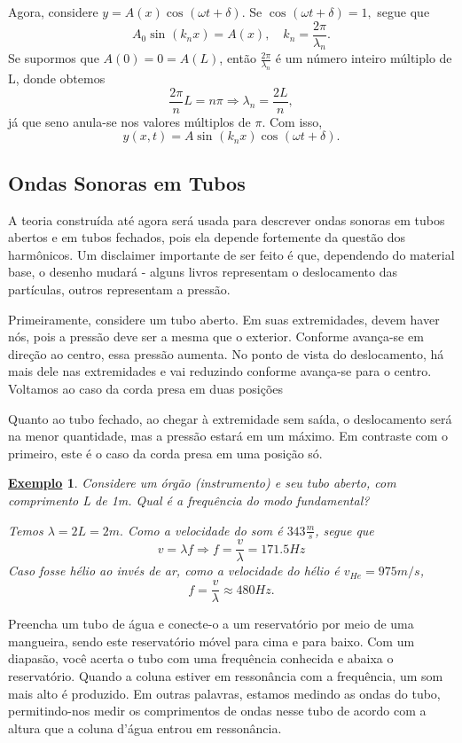 \documentclass{article}
\newtheorem{example}{\underline{Exemplo}}
\begin{document}
Agora, considere \(y = A(x)\cos^{}{(\omega t + \delta )}\). Se \(\cos^{}{(\omega t + \delta )}=1,\) segue que 
\[
  A_{0}\sin^{}{(k_{n}x)} = A(x),\quad k_{n} = \frac{2\pi }{\lambda_{n}}.
\]
Se supormos que \(A(0) = 0 = A(L)\), então \(\frac{2\pi }{\lambda_{n}}\) é um número inteiro múltiplo de L, donde obtemos 
\[
  \frac{2\pi }{n}L = n\pi \Rightarrow \lambda_{n} = \frac{2L}{n},
\]
já que seno anula-se nos valores múltiplos de \(\pi \). Com isso, 
\[
  y(x, t) = A\sin^{}{(k_{n}x)}\cos^{}{(\omega t + \delta )}.
\]
\subsection{Ondas Sonoras em Tubos}
A teoria construída até agora será usada para descrever ondas sonoras em tubos abertos e em tubos fechados, pois ela depende fortemente
da questão dos harmônicos. Um disclaimer importante de ser feito é que, dependendo do material base, o desenho mudará - alguns livros representam
o deslocamento das partículas, outros representam a pressão.

Primeiramente, considere um tubo aberto. Em suas extremidades, devem haver nós, pois a pressão deve ser a mesma que o exterior. Conforme avança-se
em direção ao centro, essa pressão aumenta. No ponto de vista do deslocamento, há mais dele nas extremidades e vai reduzindo conforme avança-se para o
centro. Voltamos ao caso da corda presa em duas posições

Quanto ao tubo fechado, ao chegar à extremidade sem saída, o deslocamento será na menor quantidade, mas a pressão estará em um máximo.
Em contraste com o primeiro, este é o caso da corda presa em uma posição só.
\begin{example}
  Considere um órgão (instrumento) e seu tubo aberto, com comprimento L de 1m. Qual é a frequência do modo fundamental?

  Temos \(\lambda  = 2L = 2m. \) Como a velocidade do som é \(343 \frac{m}{s}\), segue que 
  \[
    v = \lambda f \Rightarrow f = \frac{v}{\lambda } = 171.5 Hz 
  \]
  Caso fosse hélio ao invés de ar, como a velocidade do hélio é \(v_{He} = 975m/s\), 
  \[
    f = \frac{v}{\lambda } \approx 480Hz.
  \]
\end{example}
Preencha um tubo de água e conecte-o a um reservatório por meio de uma mangueira, sendo este reservatório móvel para cima e para baixo. Com um diapasão, 
você acerta o tubo com uma frequência conhecida e abaixa o reservatório. Quando a coluna estiver em ressonância com a frequência, um som mais alto é produzido.
Em outras palavras, estamos medindo as ondas do tubo, permitindo-nos medir os comprimentos de ondas nesse tubo de acordo com a altura que a coluna d'água entrou em ressonância.
\end{document}
